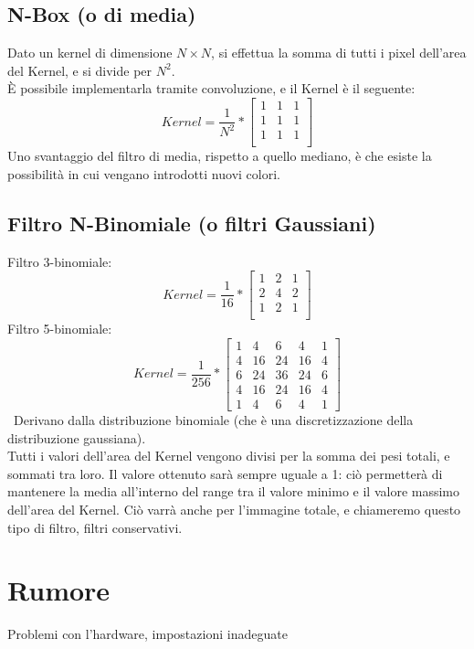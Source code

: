 \documentclass{report}
\begin{document}
	\subsection{N-Box (o di media)}
	Dato un kernel di dimensione $N \times N$, si effettua la somma di tutti i pixel dell'area del Kernel, e si divide per $N^2$.\\
	È possibile implementarla tramite convoluzione, e il Kernel è il seguente:
	$$
	Kernel = \frac{1}{N^2} *
	\begin{bmatrix}
		1 & 1 & 1 \\
		1 & 1 & 1 \\
		1 & 1 & 1 \\
	\end{bmatrix}
	$$
	Uno svantaggio del filtro di media, rispetto a quello mediano, è che esiste la possibilità in cui vengano introdotti nuovi colori.
	
	\newpage
	\subsection{Filtro N-Binomiale (o filtri Gaussiani)}
	Filtro 3-binomiale:
	$$
	Kernel = \frac{1}{16} *
	\begin{bmatrix}
		1 & 2 & 1 \\
		2 & 4 & 2 \\
		1 & 2 & 1 \\
	\end{bmatrix}
	$$
	Filtro 5-binomiale:
	$$
	Kernel = \frac{1}{256} *
	\begin{bmatrix}
		1 & 4  & 6  & 4  & 1 \\
		4 & 16 & 24 & 16 & 4 \\
		6 & 24 & 36 & 24 & 6 \\
		4 & 16 & 24 & 16 & 4 \\
		1 & 4  & 6  & 4  & 1 
	\end{bmatrix}
	$$
	\
	Derivano dalla distribuzione binomiale (che è una discretizzazione della distribuzione gaussiana).\\
	Tutti i valori dell'area del Kernel vengono divisi per la somma dei pesi totali, e sommati tra loro. Il valore ottenuto sarà sempre uguale a 1: ciò permetterà di mantenere la media all'interno del range tra il valore minimo e il valore massimo dell'area del Kernel. Ciò varrà anche per l'immagine totale, e chiameremo questo tipo di filtro, filtri conservativi.
	
	\section{Rumore}
	Problemi con l'hardware, impostazioni inadeguate
\end{document}

